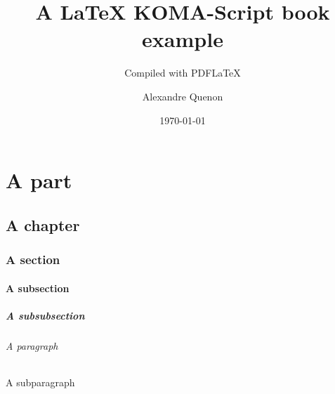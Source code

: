 \documentclass[fontsize=11pt, paper=portait,A4]{scrbook}
\title{A \LaTeX{} KOMA-Script book example}
\subtitle{Compiled with PDF\LaTeX{}}
\author{Alexandre Quenon}
\date{\today}
\begin{document}

\maketitle


\frontmatter

\tableofcontents


\mainmatter


\part{A part}

	\lipsum


\chapter{A chapter}

	\lipsum[1]


	\section{A section}
	
		\lipsum[2]
		
		
		\subsection{A subsection}
		
			\lipsum[3]
			
			
			\subsubsection{A subsubsection}
			
				\lipsum[4]
				
				
				\paragraph{A paragraph}
				
					\lipsum[5]
					
					
					\subparagraph{A subparagraph}
					
						\lipsum[6]
						
						
						
							\lipsum[7]
	


	\lipsum[1]
	
\end{document}
